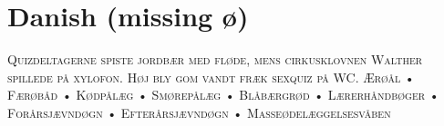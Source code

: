 

\presection\section*{\checkno Danish (missing ø)}\postsection

\textsc{Quizdeltagerne spiste jordbær med fløde, 
mens cirkusklovnen Walther spillede på xylofon. 
Høj bly gom vandt fræk sexquiz på WC.
Ærøål • Færøbåd • Kødpålæg • Smørepålæg • Blåbærgrød • Lærerhåndbøger • 
Forårsjævndøgn • Efterårsjævndøgn • Masseødelæggelsesvåben}